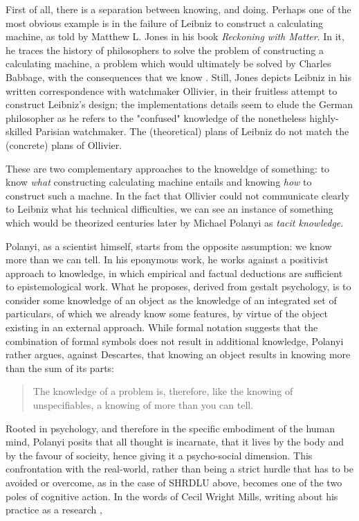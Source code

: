 First of all, there is a separation between knowing, and doing. Perhaps one of the most obvious example is in the failure of Leibniz to construct a calculating machine, as told by Matthew L. Jones in his book \emph{Reckoning with Matter}. In it, he traces the history of philosophers to solve the problem of constructing a calculating machine, a problem which would ultimately be solved by Charles Babbage, with the consequences that we know \citep{jones_reckoning_2016}. Still, Jones depicts Leibniz in his written correspondence with watchmaker Ollivier, in their fruitless attempt to construct Leibniz's design; the implementations details seem to elude the German philosopher as he refers to the "confused" knowledge of the nonetheless highly-skilled Parisian watchmaker. The (theoretical) plans of Leibniz do not match the (concrete) plans of Ollivier.

These are two complementary approaches to the knoweldge of something: to know \emph{what} constructing calculating machine entails and knowing \emph{how} to construct such a machne. In the fact that Ollivier could not communicate clearly to Leibniz what his technical difficulties, we can see an instance of something which would be theorized centuries later by Michael Polanyi as \emph{tacit knowledge}.

Polanyi, as a scientist himself, starts from the opposite assumption: we know more than we can tell. In his eponymous work, he works against a positivist approach to knowledge, in which empirical and factual deductions are sufficient to epistemological work. What he proposes, derived from gestalt psychology, is to consider some knowledge of an object as the knowledge of an integrated set of particulars, of which we already know some features, by virtue of the object existing in an external approach. While formal notation suggests that the combination of formal symbols does not result in additional knowledge, Polanyi rather argues, against Descartes, that knowing an object results in knowing more than the sum of its parts:

\begin{quote}
    The knowledge of a problem is, therefore, like the knowing of unspecifiables, a knowing of more than you can tell. \citep{polanyi_knowing_1969}
\end{quote}

Rooted in psychology, and therefore in the specific embodiment of the human mind, Polanyi posits that all thought is incarnate, that it lives by the body and by the favour of socieity, hence giving it a psycho-social dimension. This confrontation with the real-world, rather than being a strict hurdle that has to be avoided or overcome, as in the case of SHRDLU above, becomes one of the two poles of cognitive action. In the words of Cecil Wright Mills, writing about his practice as a research ,


